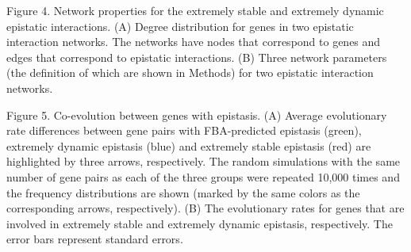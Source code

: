 Figure 4. Network properties for the extremely stable and extremely
dynamic epistatic interactions. (A) Degree distribution for genes in
two epistatic interaction networks. The networks have nodes that
correspond to genes and edges that correspond to epistatic
interactions. (B) Three network parameters (the definition of which
are shown in Methods) for two epistatic interaction networks.

Figure 5. Co-evolution between genes with epistasis. (A) Average
evolutionary rate differences between gene pairs with FBA-predicted
epistasis (green), extremely dynamic epistasis (blue) and extremely
stable epistasis (red) are highlighted by three arrows,
respectively. The random simulations with the same number of gene
pairs as each of the three groups were repeated 10,000 times and the
frequency distributions are shown (marked by the same colors as the
corresponding arrows, respectively). (B) The evolutionary rates for
genes that are involved in extremely stable and extremely dynamic
epistasis, respectively. The error bars represent standard errors.
